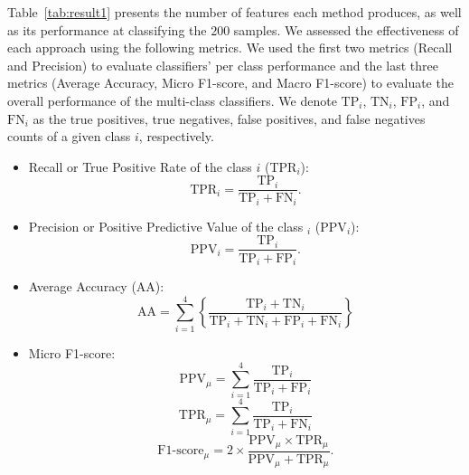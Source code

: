 \documentclass[journal]{IEEEtran}
\begin{document}
	Table~\ref{tab:result1} presents the number of features each method produces, as well as its performance at classifying the $200$ samples.
	We assessed the effectiveness of each approach using the following metrics. We used the first two metrics (Recall and Precision) to evaluate classifiers' per class performance and the last three metrics (Average Accuracy, Micro F1-score, and Macro F1-score) to evaluate the overall performance of the multi-class classifiers. We denote $\text{TP}_i$, $\text{TN}_i$, $\text{FP}_i$, and $\text{FN}_i$ as the true positives, true negatives, false positives, and false negatives counts of a given class $i$, respectively.
	\begin{itemize}
		\item Recall or True Positive Rate of the class $i$ (TPR$_i$): 
		\begin{equation*}
		\text{TPR$_i$} = \frac{\text{TP}_i}{\text{TP}_i + \text{FN}_i}.
		\end{equation*}
		\item Precision or Positive Predictive Value of the class $_i$ (PPV$_i$): \begin{equation*}
		\text{PPV$_i$} = \frac{\text{TP}_i}{\text{TP}_i + \text{FP}_i}.
		\end{equation*}
		\item Average Accuracy (AA): 
		\begin{equation*}
		\text{AA} = \sum^{\text{4}}_{i = 1}\left\{\frac{\text{TP}_i + \text{TN}_i}{\text{TP}_i + \text{TN}_i + \text{FP}_i + \text{FN}_i}\right\} 
		\end{equation*}
		\item Micro F1-score: 
		\begin{equation*}
		\text{PPV}_\mu = \sum^{\text{4}}_{i = 1}\frac{\text{TP}_i}{\text{TP}_i + \text{FP}_i}
		\end{equation*}
		\begin{equation*}
		\text{TPR}_\mu = \sum^{\text{4}}_{i = 1}\frac{\text{TP}_i}{\text{TP}_i + \text{FN}_i}
		\end{equation*}
		\begin{equation*}
		\text{F1-score}_\mu = 2 \times \frac{\text{PPV}_\mu \times \text{TPR}_\mu}{\text{PPV}_\mu + \text{TPR}_\mu}.
		\end{equation*}

\end{itemize}
\end{document}
